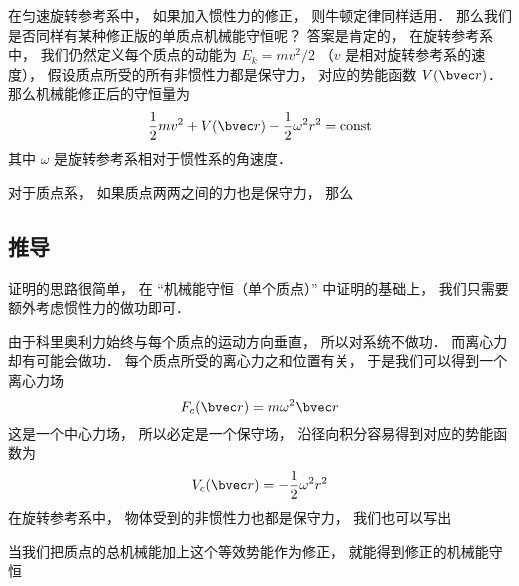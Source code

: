 

在匀速旋转参考系中， 如果加入惯性力的修正， 则牛顿定律同样适用． 那么我们是否同样有某种修正版的单质点机械能守恒呢？ 答案是肯定的， 在旋转参考系中， 我们仍然定义每个质点的动能为 $E_k = mv^2/2$ （$v$ 是相对旋转参考系的速度）， 假设质点所受的所有非惯性力都是保守力， 对应的势能函数 $V(\bvec r)$． 那么机械能修正后的守恒量为
\begin{equation}
\frac{1}{2}m v^2 + V(\bvec r) - \frac{1}{2}\omega^2 r^2 = \text{const}
\end{equation}
其中 $\omega$ 是旋转参考系相对于惯性系的角速度．

对于质点系， 如果质点两两之间的力也是保守力， 那么

\subsection{推导}
证明的思路很简单， 在 “机械能守恒（单个质点）” 中证明的基础上， 我们只需要额外考虑惯性力的做功即可．

由于科里奥利力始终与每个质点的运动方向垂直， 所以对系统不做功． 而离心力却有可能会做功． 每个质点所受的离心力之和位置有关， 于是我们可以得到一个离心力场
\begin{equation}
F_c(\bvec r) = m\omega^2 \bvec r
\end{equation}
 这是一个中心力场， 所以必定是一个保守场， 沿径向积分容易得到对应的势能函数为
\begin{equation}
V_c(\bvec r) = -\frac{1}{2}\omega^2 r^2
\end{equation}
在旋转参考系中， 物体受到的非惯性力也都是保守力， 我们也可以写出

当我们把质点的总机械能加上这个等效势能作为修正， 就能得到修正的机械能守恒
